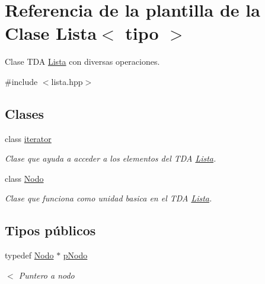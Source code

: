 \hypertarget{classLista}{}\section{Referencia de la plantilla de la Clase Lista$<$ tipo $>$}
\label{classLista}


Clase T\+DA \hyperlink{classLista}{Lista} con diversas operaciones.  




{\ttfamily \#include $<$lista.\+hpp$>$}

\subsection*{Clases}
\begin{DoxyCompactItemize}
\item 
class \hyperlink{classLista_1_1iterator}{iterator}
\begin{DoxyCompactList}\small\item\em Clase que ayuda a acceder a los elementos del T\+DA \hyperlink{classLista}{Lista}. \end{DoxyCompactList}\item 
class \hyperlink{classLista_1_1Nodo}{Nodo}
\begin{DoxyCompactList}\small\item\em Clase que funciona como unidad basica en el T\+DA \hyperlink{classLista}{Lista}. \end{DoxyCompactList}\end{DoxyCompactItemize}
\subsection*{Tipos públicos}
\begin{DoxyCompactItemize}
\item 
\mbox{\label{classLista_a0059fae2a7636eef85cdced28ab42386}} 
typedef \hyperlink{classLista_1_1Nodo}{Nodo} $\ast$ \hyperlink{classLista_a0059fae2a7636eef85cdced28ab42386}{p\+Nodo}
\begin{DoxyCompactList}\small\item\em $<$ Puntero a nodo \end{DoxyCompactList}\end{DoxyCompactItemize}
